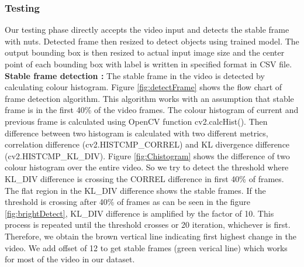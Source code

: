 \documentclass[journal,onecolumn,12pt]{IEEEtran}
\begin{document}
\subsubsection{\textbf{Testing}}
Our testing phase directly accepts the video input and detects the stable frame with nuts. Detected frame then resized to detect objects using trained model. The output bounding box is then resized to actual input image size and the center point of each bounding box with label is written in specified format in CSV file.
\textbf{\newline Stable frame detection :} The stable frame in the video is detected by calculating colour histogram. Figure \ref{fig:detectFrame} shows the flow chart of frame detection algorithm. This algorithm works with an assumption that stable frame is in the first 40\% of the video frames. The colour histogram of current and previous frame is calculated using OpenCV function cv2.calcHist(). Then difference between two histogram is calculated with two different metrics, correlation difference (cv2.HISTCMP\_CORREL) and KL divergence difference (cv2.HISTCMP\_KL\_DIV). Figure \ref{fig:Chistogram} shows the difference of two colour histogram over the entire video. So we try to detect the threshold where KL\_DIV difference is crossing the CORREL difference in first 40\% of frames. The flat region in the KL\_DIV difference shows the stable frames. If the threshold is crossing after 40\% of frames as can be seen in the figure \ref{fig:brightDetect}, KL\_DIV difference is amplified by the factor of 10. This process is repeated until the threshold crosses or 20 iteration, whichever is first. Therefore, we obtain the brown vertical line indicating first highest change in the video. We add offset of 12 to get stable frames (green verical line) which works for most of the video in our dataset. 
\end{document}
